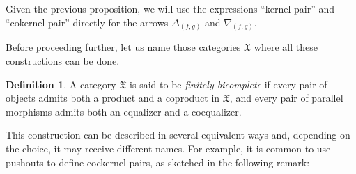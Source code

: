 \documentclass[12pt]{article}
\theoremstyle{definition}
\newtheorem{definition}[lemma]{Definition}
\def\X{\mathfrak X}
\numberwithin{equation}{section}
\begin{document}
Given the previous proposition, we will use the expressions ``kernel pair'' and ``cokernel pair'' directly for the arrows $\Delta_{(f,g)}$ and $\nabla_{(f,g)}$. 

Before proceeding further, let us name those categories $\X$ where all these constructions can be done.

\begin{definition}
A category $\X$ is said to be {\em finitely bicomplete} if every pair of objects admits both a product and a coproduct in $\X$, and every pair of parallel morphisms admits both an equalizer and a coequalizer.
\end{definition}

\iffalse 

\begin{definition}
Let $\phi\colon X\to Y$ be a morphism in a finitely bicomplete category $\X$, and consider the following diagrams
\[
\xymatrix@C=50pt{
X\ar@/^15pt/[rr]^{\iota_1\circ \phi}\ar@/_15pt/[rr]_{\iota_2\circ \phi}\ar[r]^-{\phi}&Y\ar@<-.5ex>[r]_-{\iota_2} \ar@<.5ex>[r]^-{\iota_1}&Y\sqcup Y
}
\qquad\text{and}\qquad\xymatrix@C=50pt{
X\times X\ar@<-.5ex>[r]_-{\pi_2} \ar@<.5ex>[r]^-{\pi_1} \ar@/^15pt/[rr]^{\phi\circ\pi_1}\ar@/_15pt/[rr]_{\phi\circ\pi_2}&X\ar[r]^-{\phi}&Y.
}
\]
The {\em cokernel pair}  and the {\em kernel pair} of $\phi\colon X\to Y$ are defined, respectively, as the coequalizer of $\iota_1\circ \phi$ and $\iota_2\circ \phi$, and the equalizer  of the pair $\phi\circ\pi_1$ and $\phi\circ\pi_2$.
\end{definition}
\fi 
\iffalse 
This construction can be described in several equivalent ways and, depending on the choice, it may receive different names. For example, it is common to use pushouts to define cockernel pairs, as sketched in the following remark:
\end{document}
